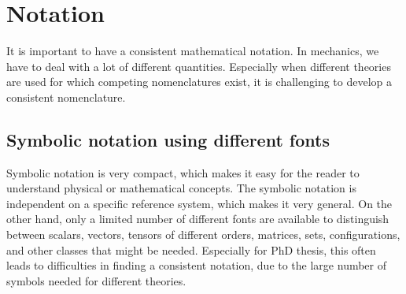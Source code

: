\section{Notation}
It is important to have a consistent mathematical notation. In mechanics, we have to deal with a lot of different quantities. Especially when different theories are used for which competing nomenclatures exist, it is challenging to develop a consistent nomenclature.

\subsection{Symbolic notation using different fonts}
Symbolic notation is very compact, which makes it easy for the reader to understand physical or mathematical concepts. The symbolic notation is independent on a specific reference system, which makes it very general. On the other hand, only a limited number of different fonts are available to distinguish between scalars, vectors, tensors of different orders, matrices, sets, configurations, and other classes that might be needed. Especially for PhD thesis, this often leads to difficulties in finding a consistent notation, due to the large number of symbols needed for different theories.
